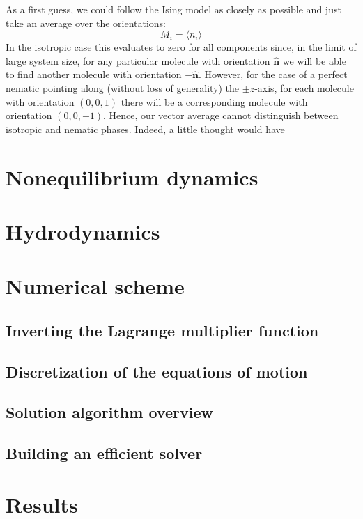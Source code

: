 \documentclass[reqno]{article}
\begin{document}
  As a first guess, we could follow the Ising model as closely as
  possible and just take an average over the orientations:
  \begin{equation*}
    M_i = \langle n_i \rangle
  \end{equation*}
	In the isotropic case this evaluates to zero for all components since, in the
  limit of large system size, for any particular molecule with orientation $\hat{\mathbf{n}}$ we
  will be able to find another molecule with orientation $-\hat{\mathbf{n}}$.
  However, for the case of a perfect nematic pointing along (without loss of
  generality) the $\pm z$-axis, for each molecule with orientation $(0, 0, 1)$
  there will be a corresponding molecule with orientation $(0, 0, -1)$.
  Hence, our vector average cannot distinguish between isotropic and nematic
  phases.
  Indeed, a little thought would have

  \section{Nonequilibrium dynamics}

  \section{Hydrodynamics}

  \section{Numerical scheme}
  \subsection{Inverting the Lagrange multiplier function}
  \subsection{Discretization of the equations of motion}
  \subsection{Solution algorithm overview}
  \subsection{Building an efficient solver}

  \section{Results}
\end{document}
